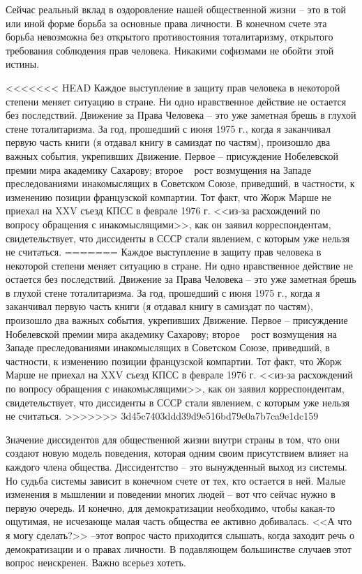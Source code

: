 \documentclass{book}
\begin{document}
{Сейчас реальный вклад в оздоровление нашей общественной жизни -- это в той или иной форме борьба за основные права личности. В конечном счете эта борьба невозможна без откры­того противостояния тоталитаризму, открытого требования соблюдения прав человека. Никакими софизмами не обойти этой истины.

<<<<<<< HEAD
Каждое выступление в защиту прав человека в некоторой степени меняет ситуацию в стране. Ни одно нравственное дейст­вие не остается без последствий. Движение за Права Человека -- это уже заметная брешь в глухой стене тоталитаризма. За год, прошедший с июня 1975 г., когда я заканчивал первую часть книги (я отдавал книгу в самиздат по частям), произошло два важных события, укрепивших Движение. Первое -- присужде­ние Нобелевской премии мира академику Сахарову; второе ~ рост возмущения на Западе преследованиями инакомыслящих в Советском Союзе, приведший, в частности, к изменению по­зиции французской компартии. Тот факт, что Жорж Марше не приехал на XXV съезд КПСС в феврале 1976 г. <<из‑за расхожде­ний по вопросу обращения с инакомыслящими>>, как он заявил корреспондентам, свидетельствует, что диссиденты в СССР стали явлением, с которым уже нельзя не считаться.
=======
Каждое выступление в защиту прав человека в некоторой степени меняет ситуацию в стране. Ни одно нравственное дейст­вие не остается без последствий. Движение за Права Человека -- это уже заметная брешь в глухой стене тоталитаризма. За год, прошедший с июня 1975 г., когда я заканчивал первую часть книги (я отдавал книгу в самиздат по частям), произошло два важных события, укрепивших Движение. Первое -- присужде­ние Нобелевской премии мира академику Сахарову; второе ~ рост возмущения на Западе преследованиями инакомыслящих в Советском Союзе, приведший, в частности, к изменению по­зиции французской компартии. Тот факт, что Жорж Марше не приехал на XXV съезд КПСС в феврале 1976 г. <<из-за расхожде­ний по вопросу обращения с инакомыслящими>>, как он заявил корреспондентам, свидетельствует, что диссиденты в СССР стали явлением, с которым уже нельзя не считаться.
>>>>>>> 3d45c7403ddd39d9e516bd79e0a7b7ca9e1dc159

Значение диссидентов для общественной жизни внутри страны в том, что они создают новую модель поведения, которая одним своим присутствием влияет на каждого члена общества. Диссидентство -- это вынужденный выход из системы. Но судьба системы зависит в конечном счете от тех, кто остается в ней. Малые изменения в мышлении и поведении многих людей -- вот что сейчас нужно в первую очередь. И конечно, для демокра­тизации необходимо, чтобы какая-то ощутимая, не исчезающе малая часть общества ее активно добивалась. <<А что я могу сделать?>> --этот вопрос часто приходится слышать, когда заходит речь о демократизации и о правах личности. В подавляющем большинстве случаев этот вопрос неискренен. Важно всерьез хотеть. 

}
\end{document}
